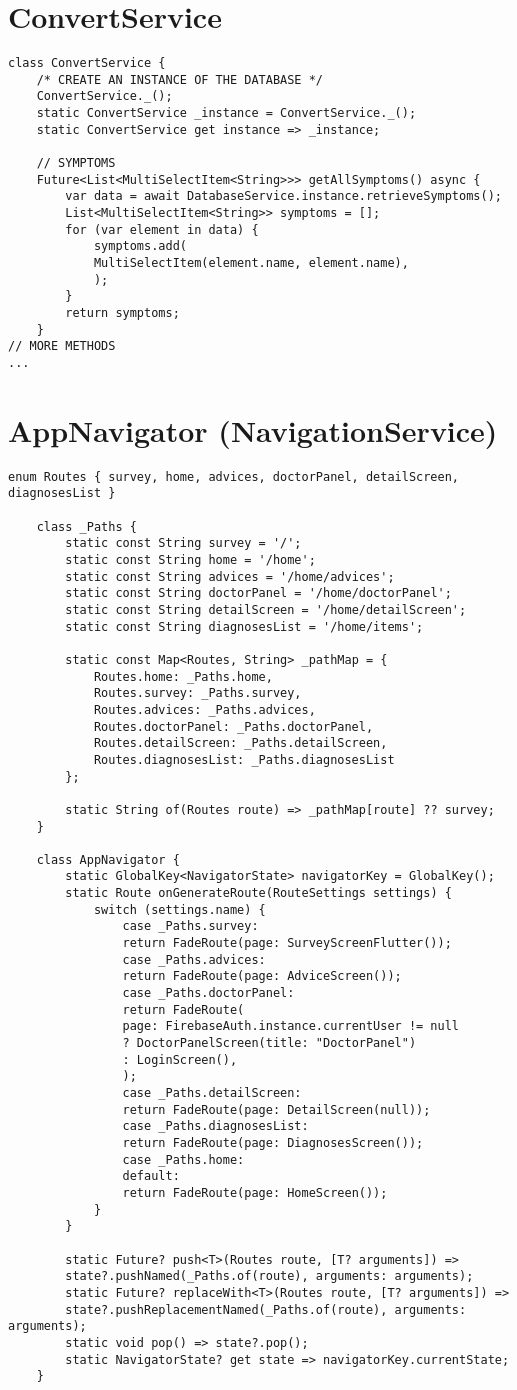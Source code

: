 \section{ConvertService}
\begin{lstlisting}[caption=AppNavigator Class]
class ConvertService {
	/* CREATE AN INSTANCE OF THE DATABASE */
	ConvertService._();
	static ConvertService _instance = ConvertService._();
	static ConvertService get instance => _instance;
	
	// SYMPTOMS
	Future<List<MultiSelectItem<String>>> getAllSymptoms() async {
		var data = await DatabaseService.instance.retrieveSymptoms();
		List<MultiSelectItem<String>> symptoms = [];
		for (var element in data) {
			symptoms.add(
			MultiSelectItem(element.name, element.name),
			);
		}
		return symptoms;
	}
// MORE METHODS
...
\end{lstlisting}
\pagebreak
\section{AppNavigator (NavigationService)}
\begin{lstlisting}[caption=AppNavigator Class]
	enum Routes { survey, home, advices, doctorPanel, detailScreen, diagnosesList }
	
	class _Paths {
		static const String survey = '/';
		static const String home = '/home';
		static const String advices = '/home/advices';
		static const String doctorPanel = '/home/doctorPanel';
		static const String detailScreen = '/home/detailScreen';
		static const String diagnosesList = '/home/items';
		
		static const Map<Routes, String> _pathMap = {
			Routes.home: _Paths.home,
			Routes.survey: _Paths.survey,
			Routes.advices: _Paths.advices,
			Routes.doctorPanel: _Paths.doctorPanel,
			Routes.detailScreen: _Paths.detailScreen,
			Routes.diagnosesList: _Paths.diagnosesList
		};
		
		static String of(Routes route) => _pathMap[route] ?? survey;
	}
	
	class AppNavigator {
		static GlobalKey<NavigatorState> navigatorKey = GlobalKey();
		static Route onGenerateRoute(RouteSettings settings) {
			switch (settings.name) {
				case _Paths.survey:
				return FadeRoute(page: SurveyScreenFlutter());
				case _Paths.advices:
				return FadeRoute(page: AdviceScreen());
				case _Paths.doctorPanel:
				return FadeRoute(
				page: FirebaseAuth.instance.currentUser != null
				? DoctorPanelScreen(title: "DoctorPanel")
				: LoginScreen(),
				);
				case _Paths.detailScreen:
				return FadeRoute(page: DetailScreen(null));
				case _Paths.diagnosesList:
				return FadeRoute(page: DiagnosesScreen());
				case _Paths.home:
				default:
				return FadeRoute(page: HomeScreen());
			}
		}
		
		static Future? push<T>(Routes route, [T? arguments]) =>
		state?.pushNamed(_Paths.of(route), arguments: arguments);
		static Future? replaceWith<T>(Routes route, [T? arguments]) =>
		state?.pushReplacementNamed(_Paths.of(route), arguments: arguments);
		static void pop() => state?.pop();
		static NavigatorState? get state => navigatorKey.currentState;
	}
\end{lstlisting}

